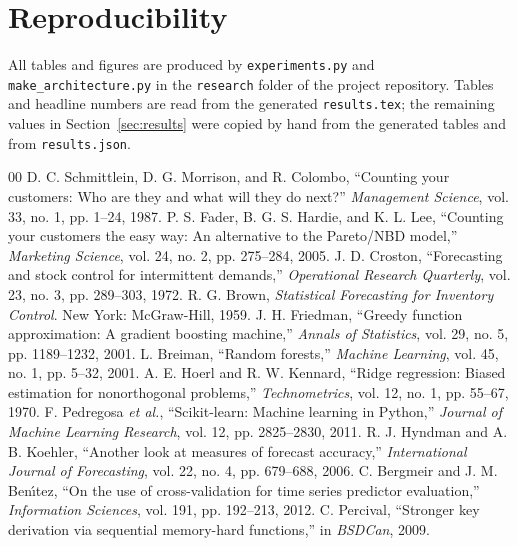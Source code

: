 \documentclass[conference]{IEEEtran}
\begin{document}
\section*{Reproducibility}
\raggedright All tables and figures are produced by \texttt{experiments.py} and \texttt{make\_architecture.py} in the \texttt{research} folder of the project repository. Tables and headline numbers are read from the generated \texttt{results.tex}; the remaining values in Section~\ref{sec:results} were copied by hand from the generated tables and from \texttt{results.json}.

\begin{thebibliography}{00}
 D. C. Schmittlein, D. G. Morrison, and R. Colombo, ``Counting your customers: Who are they and what will they do next?'' \emph{Management Science}, vol. 33, no. 1, pp. 1--24, 1987.
 P. S. Fader, B. G. S. Hardie, and K. L. Lee, ``Counting your customers the easy way: An alternative to the Pareto/NBD model,'' \emph{Marketing Science}, vol. 24, no. 2, pp. 275--284, 2005.
 J. D. Croston, ``Forecasting and stock control for intermittent demands,'' \emph{Operational Research Quarterly}, vol. 23, no. 3, pp. 289--303, 1972.
 R. G. Brown, \emph{Statistical Forecasting for Inventory Control}. New York: McGraw-Hill, 1959.
 J. H. Friedman, ``Greedy function approximation: A gradient boosting machine,'' \emph{Annals of Statistics}, vol. 29, no. 5, pp. 1189--1232, 2001.
 L. Breiman, ``Random forests,'' \emph{Machine Learning}, vol. 45, no. 1, pp. 5--32, 2001.
 A. E. Hoerl and R. W. Kennard, ``Ridge regression: Biased estimation for nonorthogonal problems,'' \emph{Technometrics}, vol. 12, no. 1, pp. 55--67, 1970.
 F. Pedregosa \emph{et al.}, ``Scikit-learn: Machine learning in Python,'' \emph{Journal of Machine Learning Research}, vol. 12, pp. 2825--2830, 2011.
 R. J. Hyndman and A. B. Koehler, ``Another look at measures of forecast accuracy,'' \emph{International Journal of Forecasting}, vol. 22, no. 4, pp. 679--688, 2006.
 C. Bergmeir and J. M. Ben{\'\i}tez, ``On the use of cross-validation for time series predictor evaluation,'' \emph{Information Sciences}, vol. 191, pp. 192--213, 2012.
 C. Percival, ``Stronger key derivation via sequential memory-hard functions,'' in \emph{BSDCan}, 2009.
\end{thebibliography}
\end{document}
